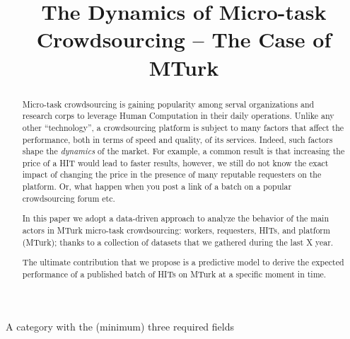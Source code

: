 \documentclass{llncs}
\begin{document}
%

\title{The Dynamics of Micro-task Crowdsourcing -- The Case of MTurk}



\author{}

\maketitle
\begin{abstract}
Micro-task crowdsourcing is gaining popularity among serval organizations and research corps to leverage Human Computation in their daily operations. Unlike any other ``technology'', a crowdsourcing platform is subject to many factors that affect the performance, both in terms of speed and quality, of its services. Indeed, such factors shape the \emph{dynamics} of the market. For example, a common result is that increasing the price of a HIT would lead to faster results, however, we still do not know the exact impact of changing the price in the presence of many reputable requesters on the platform. Or, what happen when you post a link of a batch on a popular crowdsourcing forum etc.

In this paper we adopt a data-driven approach to analyze the behavior of the main actors in MTurk micro-task crowdsourcing: workers, requesters, HITs, and platform (MTurk); thanks to a collection of datasets that we gathered during the last X year.

The ultimate contribution that we propose is a predictive model to derive the expected performance of a published batch of HITs on MTurk at a specific moment in time.

\end{abstract}

A category with the (minimum) three required fields
\end{document}
